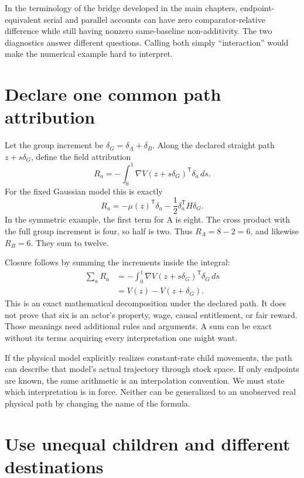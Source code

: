 In the terminology of the bridge developed in the main chapters, endpoint-equivalent serial and parallel accounts can have zero comparator-relative difference while still having nonzero same-baseline non-additivity. The two diagnostics answer different questions. Calling both simply ``interaction'' would make the numerical example hard to interpret.

\section{Declare one common path attribution}

Let the group increment be \(\delta_G=\delta_A+\delta_B\). Along the declared straight path \(z+s\delta_G\), define the field attribution
\begin{equation}
R_a=-\int_0^1\nabla V(z+s\delta_G)^{\mathsf T}\delta_a\,ds.
\end{equation}
For the fixed Gaussian model this is exactly
\begin{equation}
R_a=-\mu(z)^{\mathsf T}\delta_a-\frac12\delta_a^{\mathsf T}H\delta_G.
\end{equation}
In the symmetric example, the first term for A is eight. The cross product with the full group increment is four, so half is two. Thus \(R_A=8-2=6\), and likewise \(R_B=6\). They sum to twelve.

Closure follows by summing the increments inside the integral:
\begin{align}
\sum_aR_a
&=-\int_0^1\nabla V(z+s\delta_G)^{\mathsf T}\delta_G\,ds\\
&=V(z)-V(z+\delta_G).
\end{align}
This is an exact mathematical decomposition under the declared path. It does not prove that six is an actor's property, wage, causal entitlement, or fair reward. Those meanings need additional rules and arguments. A sum can be exact without its terms acquiring every interpretation one might want.

If the physical model explicitly realizes constant-rate child movements, the path can describe that model's actual trajectory through stock space. If only endpoints are known, the same arithmetic is an interpolation convention. We must state which interpretation is in force. Neither can be generalized to an unobserved real physical path by changing the name of the formula.

\section{Use unequal children and different destinations}

